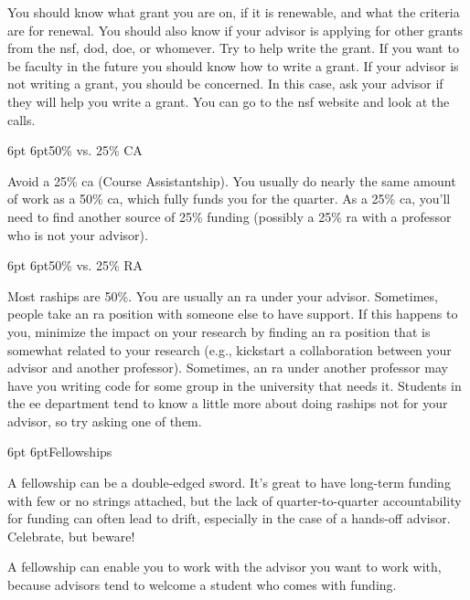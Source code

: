 \documentclass[10pt]{book}
\makeatletter
\renewcommand{\subsection}{\@startsection{subsection}{2}{0mm}%
   {6pt}%
   {6pt}{\normalfont\normalsize\itshape}}
\makeatother
\begin{document}
You should know what grant you are on, if it is renewable, and what the
criteria are for renewal. You should also know if your advisor is applying for
other grants from the {\sc nsf}, {\sc dod}, {\sc doe}, or whomever. Try to
help write the grant. If you want to be faculty in the future you
should know how to write a grant. If your advisor is not writing a
grant, you should be concerned. In this case, ask your advisor if they will
help you write a grant.  You can go to the {\sc nsf} website and look at the calls.

\subsection{50\% vs. 25\% CA}

Avoid a 25\% {\sc ca} (Course Assistantship). You usually do
nearly the same amount of work as a 50\% {\sc ca}, which fully funds you for
the quarter. As a 25\% {\sc ca}, you'll need to find another source of 25\%
funding (possibly a 25\% {\sc ra} with a professor who is not your advisor).

\subsection{50\% vs. 25\% RA}

Most {\sc ra}ships are 50\%. You are usually an {\sc ra} under your
advisor. Sometimes, people take an {\sc ra} position with someone else 
to have support.  If this happens to you, minimize the impact
on your research by finding an {\sc ra} position that is somewhat related to
your research (e.g., kickstart a collaboration between your advisor and another professor).
Sometimes, an {\sc ra} under another professor may have you writing code for some group 
in the university that needs it.
Students in the {\sc ee} department tend to know a little more about doing
{\sc ra}ships not for your advisor, so try asking one of them.

\subsection{Fellowships}

A fellowship can be a double-edged sword. It's great to have long-term funding
with few or no strings attached, but the lack of quarter-to-quarter
accountability for funding can often lead to drift, especially in the case of a
hands-off advisor. Celebrate, but beware!

A fellowship can enable you to work
with the advisor you want to work with, because advisors tend to welcome
a student who comes with funding.
\end{document}
